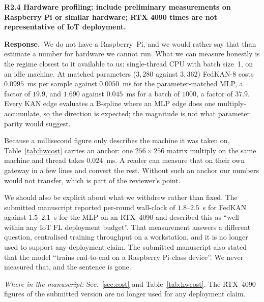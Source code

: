\documentclass[11pt]{article}
\newcommand{\rc}[1]{\medskip\noindent\textbf{\textcolor[rgb]{0.35,0.35,0.35}{#1}}\par\nopagebreak}
\newcommand{\reply}{\medskip\noindent\textbf{Response.}\ }
\newcommand{\where}[1]{\par\smallskip\noindent\emph{Where in the manuscript:} #1\par}
\begin{document}
\rc{R2.4 Hardware profiling: include preliminary measurements on Raspberry Pi or
similar hardware; RTX 4090 times are not representative of IoT deployment.}
\reply We do not have a Raspberry~Pi, and we would rather say that than estimate a number for hardware
we cannot run. What we can measure honestly is the regime closest to it available to us:
single-thread CPU with batch size~1, on an idle machine. At matched parameters ($3{,}280$ against
$3{,}362$) FedKAN-8 costs $0.0995$~ms per sample against $0.0050$~ms for the parameter-matched
MLP, a factor of $19.9$, and $1.690$ against $0.045$~ms for a batch of $1000$, a factor of
$37.9$. Every KAN edge evaluates a B-spline where an MLP edge does one multiply-accumulate, so
the direction is expected; the magnitude is not what parameter parity would suggest.

Because a millisecond figure only describes the machine it was taken on, Table~\ref{tab:hwcost}
carries an anchor: one $256\times256$ matrix multiply on the same machine and thread takes
$0.024$~ms. A reader can measure that on their own gateway in a few lines and convert the rest.
Without such an anchor our numbers would not transfer, which is part of the reviewer's point.

We should also be explicit about what we withdrew rather than fixed. The submitted manuscript
reported per-round wall-clock of $1.8$--$2.5$~s for FedKAN against $1.5$--$2.1$~s for the MLP on
an RTX~4090 and described this as ``well within any IoT FL deployment budget''. That measurement
answers a different question, centralised training throughput on a workstation, and it is no
longer used to support any deployment claim. The submitted manuscript also stated that the model
``trains end-to-end on a Raspberry Pi-class device''. We never measured that, and the sentence is
gone.
\where{Sec.~\ref{sec:cost} and Table~\ref{tab:hwcost}. The RTX~4090 figures of the submitted version are no longer used for any deployment claim.}
\end{document}

